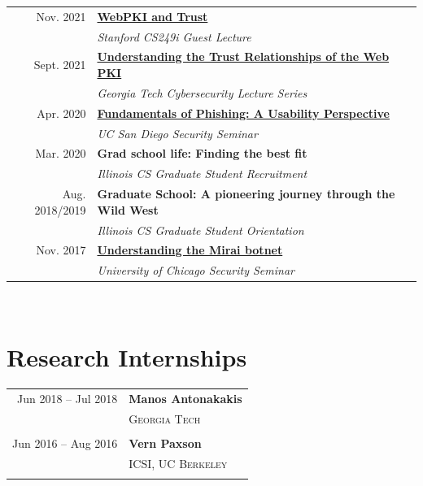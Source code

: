 \documentclass[10pt,singlecolumn]{article} %
\begin{document}
\begin{tabular}{rl}
Nov. 2021 & \textbf{\href{https://zanema.com/slides/CS249i-WebPKI.pdf}{WebPKI and Trust}}\\
& \emph{Stanford CS249i Guest Lecture}\\

Sept. 2021 & \textbf{\href{https://zanema.com/slides/gt_lecture_trust.pdf}{Understanding the Trust Relationships of the Web PKI}}\\
& \emph{Georgia Tech Cybersecurity Lecture Series}\\

Apr. 2020 & \textbf{\href{https://zanema.com/slides/ucsd_phishing.pdf}{Fundamentals of Phishing: A Usability Perspective}}\\
& \emph{UC San Diego Security Seminar}\\

Mar. 2020 & \textbf{Grad school life: Finding the best fit}\\
& \emph{Illinois CS Graduate Student Recruitment}\\

Aug. 2018/2019 & \textbf{Graduate School: A pioneering journey through the Wild West}\\
& \emph{Illinois CS Graduate Student Orientation}\\

Nov. 2017 & \textbf{\href{https://zanema.com/slides/uchicago_mirai.pdf}{Understanding the Mirai botnet}}\\
& \emph{University of Chicago Security Seminar}\\
\end{tabular} \\




\section{Research Internships} 

\begin{tabular}{rl}
Jun 2018 -- Jul 2018 & \textbf{Manos Antonakakis}\\
& \textsc{Georgia Tech}\\
&\\

Jun 2016 -- Aug 2016 & \textbf{Vern Paxson}\\
& \textsc{ICSI, UC Berkeley}\\
& \\

\end{tabular}
\end{document}
